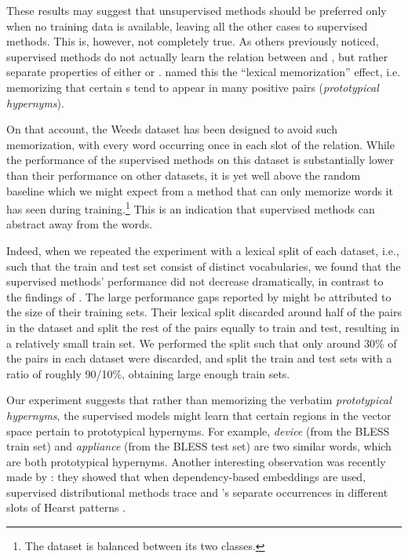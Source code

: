 \documentclass[11pt]{article}
\begin{document}
These results may suggest that unsupervised methods should be preferred only when no training data is available, leaving all the other cases to supervised methods. This is, however, not completely true. As others previously noticed, supervised methods do not actually learn the relation between  and , but rather separate properties of either  or .  named this the ``lexical memorization'' effect, i.e. memorizing that certain s tend to appear in many positive pairs (\emph{prototypical hypernyms}). 

On that account, the Weeds dataset has been designed to avoid such memorization, with every word occurring once in each slot of the relation. 
While the performance of the supervised methods on this dataset is substantially lower than their performance on other datasets, it is yet well above the random baseline which we might expect from a method that can only memorize words it has seen during training.\footnote{The dataset is balanced between its two classes.} This is an indication that supervised methods can abstract away from the words. 

Indeed, when we repeated the experiment with a lexical split of each dataset, i.e., such that the train and test set consist of distinct vocabularies, we found that the supervised methods' performance did not decrease dramatically, in contrast to the findings of . 
The large performance gaps reported by  might be attributed to the size of their training sets. Their lexical split discarded around half of the pairs in the dataset and split the rest of the pairs equally to train and test, resulting in a relatively small train set. We performed the split such that only around 30\% of the pairs in each dataset were discarded, and split the train and test sets with a ratio of roughly 90/10\%, obtaining large enough train sets.

Our experiment suggests that rather than memorizing the verbatim \emph{prototypical hypernyms}, the supervised models might learn that certain regions in the vector space pertain to prototypical hypernyms. For example, \emph{device} (from the BLESS train set) and \emph{appliance} (from the BLESS test set) are two similar words, which are both prototypical hypernyms. Another interesting observation was recently made by : they showed that when dependency-based embeddings are used, supervised distributional methods trace  and 's separate occurrences in different slots of Hearst patterns \cite{hearst1992automatic}.
\end{document}
